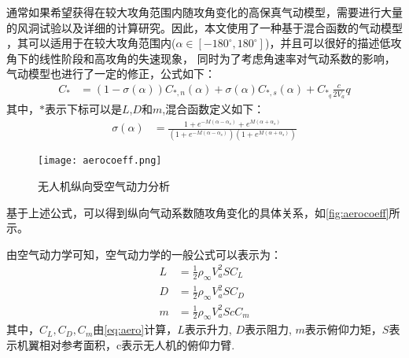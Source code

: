 通常如果希望获得在较大攻角范围内随攻角变化的高保真气动模型，需要进行大量的风洞试验以及详细的计算研究。因此，本文使用了一种基于混合函数的气动模型
，其可以适用于在较大攻角范围内($\alpha\in \left [ -180^\circ, 180^\circ\right ] $)，并且可以很好的描述低攻角下的线性阶段和高攻角的失速现象，
同时为了考虑角速率对气动系数的影响，气动模型也进行了一定的修正，公式如下\cite{kikumoto2022back,beard2012small}：
\begin{align}
    C_{*} & = (1-\sigma(\alpha))C_{*,n}(\alpha)+\sigma(\alpha)C_{*,s}(\alpha) + C_{*_{q}}\frac{c}{2V_{a}}q
    \label{eq:aero}
\end{align}
其中，$*$表示下标可以是$L$,$D$和$m$,混合函数定义如下：
\begin{align}
    \sigma(\alpha) & = \frac{1+e^{-M\left(\alpha-\alpha_{s}\right)}+e^{M\left(\alpha+\alpha_{s}\right)}}{\left(1+e^{-M\left(\alpha-\alpha_{s}\right)}\right)\left(1+e^{M\left(\alpha+\alpha_{s}\right)}\right)}
\end{align}
\begin{figure}[htbp]
    \centering
    \texttt{[image: aerocoeff.png]}
    \caption{\label{fig:aerocoeff}无人机纵向受空气动力分析}
\end{figure}
基于上述公式，可以得到纵向气动系数随攻角变化的具体关系，如\autoref{fig:aerocoeff}所示。

由空气动力学可知，空气动力学的一般公式可以表示为：
\begin{align}
    L & =\frac{1}{2} \rho_{\infty} V_{a}^{2} S C_{L} \\
    D & =\frac{1}{2} \rho_{\infty} V_{a}^{2} S C_{D} \\
    m & =\frac{1}{2} \rho_{\infty} V_{a}^{2} S c C_{m}
\end{align}
其中，$C_{L},C_{D},C_{m}$由\autoref{eq:aero}计算，$L$表示升力, $D$表示阻力, $m$表示俯仰力矩，$S$表示机翼相对参考面积，c表示无人机的俯仰力臂.
